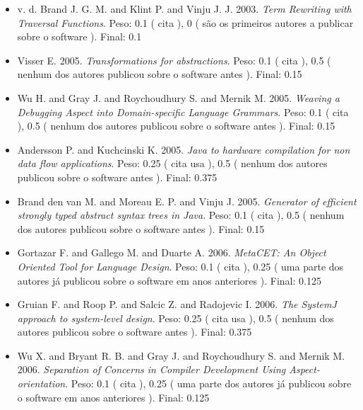 \begin{itemize}
\item v. d. Brand J. G. M. and Klint P. and Vinju J. J.
      2003.
        \textit{ Term Rewriting with Traversal Functions}.
      Peso:
      0.1 (
          cita
      ),
      0 (
são os primeiros autores a publicar sobre o software
      ).
      Final:
      0.1

\item Visser E.
      2005.
        \textit{ Transformations for abstractions}.
      Peso:
      0.1 (
          cita
      ),
      0.5 (
nenhum dos autores publicou sobre o software antes
      ).
      Final:
      0.15

\item Wu H. and Gray J. and Roychoudhury S. and Mernik M.
      2005.
        \textit{ Weaving a Debugging Aspect into Domain-specific Language Grammars}.
      Peso:
      0.1 (
          cita
      ),
      0.5 (
nenhum dos autores publicou sobre o software antes
      ).
      Final:
      0.15

\item Andersson P. and Kuchcinski K.
      2005.
        \textit{ Java to hardware compilation for non data flow applications}.
      Peso:
      0.25 (
          cita
          usa
      ),
      0.5 (
nenhum dos autores publicou sobre o software antes
      ).
      Final:
      0.375

\item Brand den van M. and Moreau E. P. and Vinju J.
      2005.
        \textit{ Generator of efficient strongly typed abstract syntax trees in Java}.
      Peso:
      0.1 (
          cita
      ),
      0.5 (
nenhum dos autores publicou sobre o software antes
      ).
      Final:
      0.15

\item Gortazar F. and Gallego M. and Duarte A.
      2006.
        \textit{ MetaCET: An Object Oriented Tool for Language Design}.
      Peso:
      0.1 (
          cita
      ),
      0.25 (
uma parte dos autores já publicou sobre o software em anos anteriores
      ).
      Final:
      0.125

\item Gruian F. and Roop P. and Salcic Z. and Radojevic I.
      2006.
        \textit{ The SystemJ approach to system-level design}.
      Peso:
      0.25 (
          cita
          usa
      ),
      0.5 (
nenhum dos autores publicou sobre o software antes
      ).
      Final:
      0.375

\item Wu X. and Bryant R. B. and Gray J. and Roychoudhury S. and Mernik M.
      2006.
        \textit{ Separation of Concerns in Compiler Development Using Aspect-orientation}.
      Peso:
      0.1 (
          cita
      ),
      0.25 (
uma parte dos autores já publicou sobre o software em anos anteriores
      ).
      Final:
      0.125


\end{itemize}
